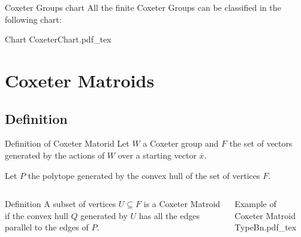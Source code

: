 \documentclass{beamer}
\newcommand{\incfig}[1]{%
\center
\def\svgwidth{0.9\columnwidth}
{#1.pdf_tex}
}
\begin{document}
\begin{frame}{Coxeter Groups chart}
  All the finite Coxeter Groups can be classified in the following chart:
  \vspace{1em}
 \begin{block}{Chart}
   \incfig{CoxeterChart}
 \end{block} 
\end{frame}

\section{Coxeter Matroids}
\subsection{Definition}
\begin{frame}{Definition of Coxeter Matorid}
  Let $W$ a Coxeter group and  $F$ the set of vectors generated by the actions of  $W$ over a starting vector  $\overline{x}$.

  Let $P$ the polytope generated by the convex hull of the set of vertices $F$.

\begin{columns}[c]
\begin{block}{Definition}
  A subset of vertices $U\subseteq F$ is a Coxeter Matroid if the convex hull $Q$ generated by $U$ has all the edges parallel to the edges of  $P$.
\end{block} 
\begin{block}{Example of Coxeter Matroid}
 \incfig{TypeBn} 
\end{block}
\end{columns}
\end{frame}
\end{document}
